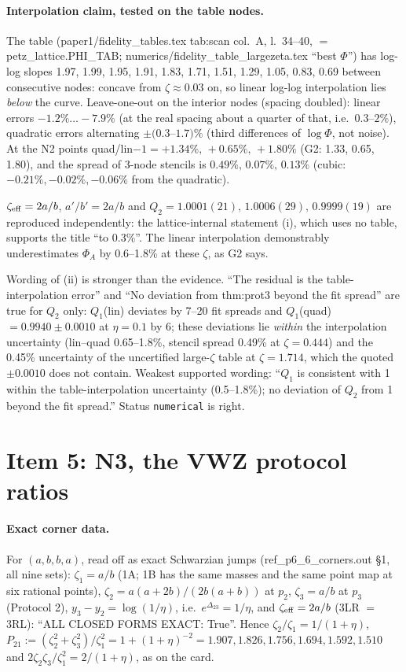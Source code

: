 \documentclass[11pt]{article}
\begin{document}
\paragraph{Interpolation claim, tested on the table nodes.} The table (paper1/fidelity\_tables.tex tab:scan col.~A,
l.~34--40, $=$ petz\_lattice.PHI\_TAB; numerics/fidelity\_table\_largezeta.tex ``best $\Phi$'') has log-log slopes
1.97, 1.99, 1.95, 1.91, 1.83, 1.71, 1.51, 1.29, 1.05, 0.83, 0.69 between consecutive nodes: concave from
$\zeta\approx0.03$ on, so linear log-log interpolation lies \emph{below} the curve. Leave-one-out on the interior
nodes (spacing doubled): linear errors $-1.2\%\dots-7.9\%$ (at the real spacing about a quarter of that, i.e.\
$0.3$--$2\%$), quadratic errors alternating $\pm(0.3$--$1.7)\%$ (third differences of $\log\Phi$, not noise).
At the N2 points quad/lin$-1=+1.34\%,\,+0.65\%,\,+1.80\%$ (G2: 1.33, 0.65, 1.80), and the spread of 3-node
stencils is $0.49\%,\,0.07\%,\,0.13\%$ (cubic: $-0.21\%,-0.02\%,-0.06\%$ from the quadratic).
\begin{verdictok}
$\zeta_{\rm eff}=2a/b$, $a'/b'=2a/b$ and $Q_2=1.0001(21),\,1.0006(29),\,0.9999(19)$ are reproduced independently:
the lattice-internal statement (i), which uses no table, supports the title ``to 0.3\%''. The linear
interpolation demonstrably underestimates $\Phi_A$ by 0.6--1.8\% at these $\zeta$, as G2 says.
\end{verdictok}
\begin{verdictgap}
Wording of (ii) is stronger than the evidence. ``The residual is the table-interpolation error'' and ``No
deviation from thm:prot3 beyond the fit spread'' are true for $Q_2$ only: $Q_1$(lin) deviates by 7--20 fit spreads
and $Q_1$(quad)$=0.9940\pm0.0010$ at $\eta=0.1$ by 6; these deviations lie \emph{within} the interpolation
uncertainty (lin--quad 0.65--1.8\%, stencil spread 0.49\% at $\zeta=0.444$) and the 0.45\% uncertainty of the
uncertified large-$\zeta$ table at $\zeta=1.714$, which the quoted $\pm0.0010$ does not contain. Weakest supported
wording: ``$Q_1$ is consistent with 1 within the table-interpolation uncertainty (0.5--1.8\%); no deviation of $Q_2$
from 1 beyond the fit spread.'' Status \texttt{numerical} is right.
\end{verdictgap}

\section{Item 5: N3, the VWZ protocol ratios}\label{sec:i5}
\paragraph{Exact corner data.} For $(a,b,b,a)$, read off as exact Schwarzian jumps (ref\_p6\_6\_corners.out \S1,
all nine sets): $\zeta_1=a/b$ (1A; 1B has the same masses and the same point map at six rational points),
$\zeta_2=a(a+2b)/(2b(a+b))$ at $p_2$, $\zeta_3=a/b$ at $p_3$ (Protocol 2), $y_3-y_2=\log(1/\eta)$, i.e.\
$e^{\Delta_{23}}=1/\eta$, and $\zeta_{\rm eff}=2a/b$ (3LR $=$ 3RL): ``ALL CLOSED FORMS EXACT: True''. Hence
$\zeta_2/\zeta_1=1/(1+\eta)$, $P_{21}:=(\zeta_2^2+\zeta_3^2)/\zeta_1^2=1+(1+\eta)^{-2}=1.907,1.826,1.756,1.694,1.592,1.510$
and $2\zeta_2\zeta_3/\zeta_1^2=2/(1+\eta)$, as on the card.
\end{document}
